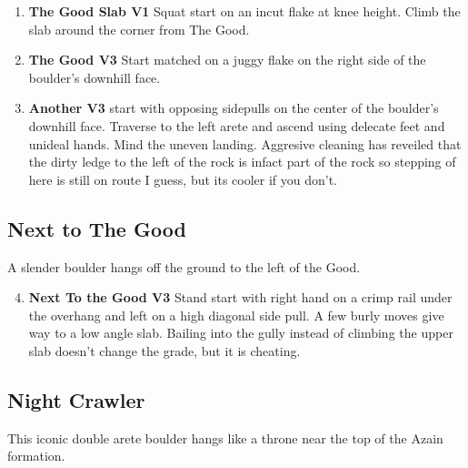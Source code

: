 \begin{multicols*}{2}
				\begin{enumerate}[]
					\setcounter{enumi}{0}
					\item\label{rt:The Good Slab} \colorbox{green!20}{\textbf{The Good Slab V1 \ding{72}   } }
					\newline Squat start on an incut flake at knee height. Climb the slab around the corner from The Good.\
					\setcounter{enumi}{1}
					\item\label{rt:The Good} \colorbox{green!20}{\textbf{The Good V3    } }
					\newline Start matched on a juggy flake on the right side of the boulder's downhill face.\
					\setcounter{enumi}{2}
					\item\label{rt:Another} \colorbox{green!20}{\textbf{Another V3   \warn } }
					\newline start with opposing sidepulls on the center of the boulder's downhill face. Traverse to the left arete and ascend using delecate feet and unideal hands. Mind the uneven landing. Aggresive cleaning has reveiled that the dirty ledge to the left of the rock is infact part of the rock so stepping of here is still on route I guess, but its cooler if you don't.\
				\end{enumerate}
			\subsection*{Next to The Good}\label{bf:Next to The Good}
			A slender boulder hangs off the ground to the left of the Good.
			
				\begin{enumerate}[]
					\setcounter{enumi}{3}
					\item\label{rt:Next To the Good} \colorbox{green!20}{\textbf{Next To the Good V3   \warn } }
					\newline Stand start with right hand on a crimp rail under the overhang and left on a high diagonal side pull. A few burly moves give way to a low angle slab. Bailing into the gully instead of climbing the upper slab doesn't change the grade, but it is cheating.\
				\end{enumerate}

			\subsection*{Night Crawler}\label{bf:Night Crawler}
			This iconic double arete boulder hangs like a throne near the top of the Azain formation.
			

\end{multicols*}
